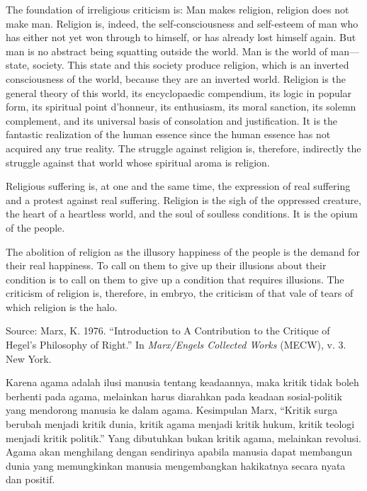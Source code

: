 \documentclass[10pt,a4paper]{article}
\renewenvironment{quote}
{\list{}{%
       \leftmargin 1.5em 
       \rightmargin 0em}
   \item\relax}
{\endlist}
\begin{document}
\begin{multicols}{2}
\begin{quote}
The foundation of irreligious criticism is: Man makes religion, religion
does not make man. Religion is, indeed, the self-consciousness and
self-esteem of man who has either not yet won through to himself, or has
already lost himself again. But man is no abstract being squatting
outside the world. Man is the world of man---state, society. This state
and this society produce religion, which is an inverted consciousness of
the world, because they are an inverted world. Religion is the general
theory of this world, its encyclopaedic compendium, its logic in popular
form, its spiritual point d'honneur, its enthusiasm, its moral sanction,
its solemn complement, and its universal basis of consolation and
justification. It is the fantastic realization of the human essence
since the human essence has not acquired any true reality. The struggle
against religion is, therefore, indirectly the struggle against that
world whose spiritual aroma is religion.

Religious suffering is, at one and the same time, the expression of real
suffering and a protest against real suffering. Religion is the sigh of
the oppressed creature, the heart of a heartless world, and the soul of
soulless conditions. It is the opium of the people.

The abolition of religion as the illusory happiness of the people is the
demand for their real happiness. To call on them to give up their
illusions about their condition is to call on them to give up a
condition that requires illusions. The criticism of religion is,
therefore, in embryo, the criticism of that vale of tears of which
religion is the halo.

Source: Marx, K. 1976. ``Introduction to A Contribution to the Critique
of Hegel's Philosophy of Right.'' In \emph{Marx/Engels Collected Works}
(MECW), v. 3. New York.
\end{quote}

Karena agama adalah ilusi manusia tentang keadaannya, maka kritik tidak
boleh berhenti pada agama, melainkan harus diarahkan pada keadaan
sosial-politik yang mendorong manusia ke dalam agama. Kesimpulan Marx,
``Kritik surga berubah menjadi kritik dunia, kritik agama menjadi kritik
hukum, kritik teologi menjadi kritik politik.'' Yang dibutuhkan bukan
kritik agama, melainkan revolusi. Agama akan menghilang dengan
sendirinya apabila manusia dapat membangun dunia yang memungkinkan
manusia mengembangkan hakikatnya secara nyata dan positif.


\end{multicols}
\end{document}
